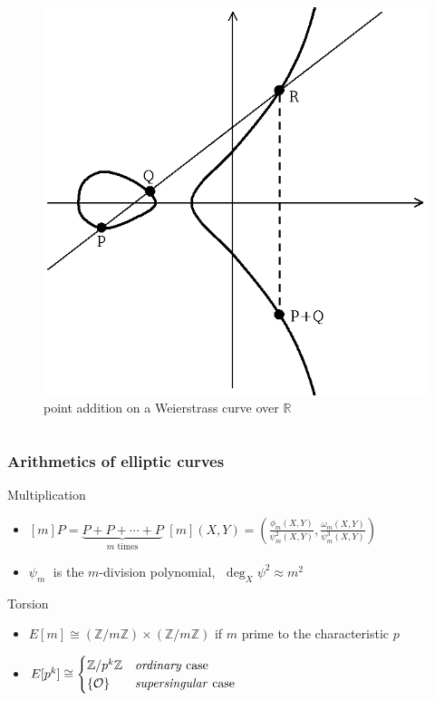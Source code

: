 \documentclass[10pt]{beamer}
\newcommand{\Z}{\mathbb{Z}}  %
\newcommand{\R}{\mathbb{R}}  %
\newcommand{\isom}{\cong}  %
\newcommand{\0}{\mathcal{O}}  %
\begin{document}
\begin{frame}
\begin{columns}
    \begin{column}{0.4\textwidth}
      \begin{figure}
        \centering
        \includegraphics[width=\textwidth]{ecadd}
        \caption{point addition on a Weierstrass curve over $\R$}
      \end{figure}
    \end{column}
  \end{columns}
\end{frame}


\begin{frame}
  \frametitle{Arithmetics of elliptic curves}

  \begin{block}{Multiplication}
    \begin{itemize}
    \item $[m]P = \underbrace{P + P + \cdots + P}_{m \text{ times}}$
      \hfill $[m](X,Y) = \left(\frac{\phi_m(X,Y)}{\psi_m^2(X,Y)},
      \frac{\omega_m(X,Y)}{\psi_m^3(X,Y)}\right)\quad$
    \item $\psi_m\;$ is the $m$-division polynomial, $\;\deg_X
      \psi^2\approx m^2$
    \end{itemize}
  \end{block}

  \begin{block}{Torsion}
    \begin{itemize}
    \item $E[m] \isom (\Z/m\Z)\times(\Z/m\Z)$ if $m$ prime to the
      characteristic $p$
    \item $E[p^k] \isom \begin{cases}
	\Z/p^k\Z &\text{\emph{ordinary} case}\\
	\{\0\} &\text{\emph{supersingular} case}
      \end{cases}$
    \end{itemize}
  \end{block}
\end{frame}
\end{document}
